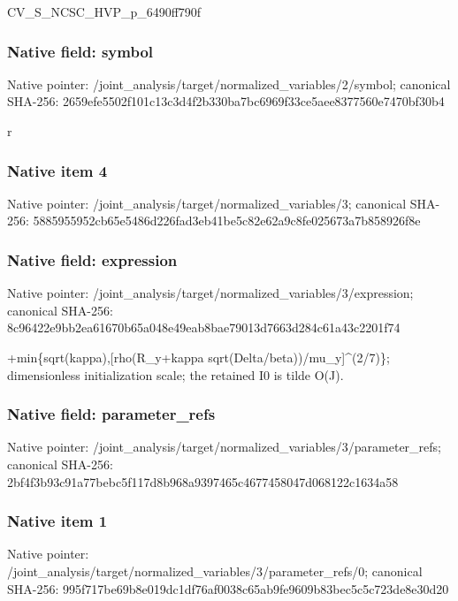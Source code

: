\documentclass[10pt,a4paper]{article}
\begin{document}
\begingroup\raggedright\sloppy CV\_\allowbreak{}S\_\allowbreak{}NCSC\_\allowbreak{}HVP\_\allowbreak{}p\_\allowbreak{}6490ff790f\par\endgroup

\subsubsection{Native field: symbol}
Native pointer: /joint\_\allowbreak{}analysis/target/normalized\_\allowbreak{}variables/2/symbol; canonical SHA-256: 2659efe5502f101c13c3d4f2b330ba7bc6969f33ce5aee8377560e7470bf30b4

\begingroup\raggedright\sloppy r\par\endgroup

\subsubsection{Native item 4}
Native pointer: /joint\_\allowbreak{}analysis/target/normalized\_\allowbreak{}variables/3; canonical SHA-256: 5885955952cb65e5486d226fad3eb41be5c82e62a9c8fe025673a7b858926f8e

\subsubsection{Native field: expression}
Native pointer: /joint\_\allowbreak{}analysis/target/normalized\_\allowbreak{}variables/3/expression; canonical SHA-256: 8c96422e9bb2ea61670b65a048e49eab8bae79013d7663d284c61a43c2201f74

\begingroup\raggedright{}+min\{sqrt(kappa),\allowbreak{}[rho(R\_\allowbreak{}y+kappa sqrt(Delta/\allowbreak{}beta))/\allowbreak{}mu\_\allowbreak{}y]\textasciicircum{}(2/\allowbreak{}7)\};\allowbreak{} dimensionless initialization scale;\allowbreak{} the retained I0 is tilde O(J).\par\endgroup

\subsubsection{Native field: parameter\_\allowbreak{}refs}
Native pointer: /joint\_\allowbreak{}analysis/target/normalized\_\allowbreak{}variables/3/parameter\_\allowbreak{}refs; canonical SHA-256: 2bf4f3b93c91a77bebc5f117d8b968a9397465c4677458047d068122c1634a58

\subsubsection{Native item 1}
Native pointer: /joint\_\allowbreak{}analysis/target/normalized\_\allowbreak{}variables/3/parameter\_\allowbreak{}refs/0; canonical SHA-256: 995f717be69b8e019dc1df76af0038c65ab9fe9609b83bec5c5c723de8e30d20
\end{document}
